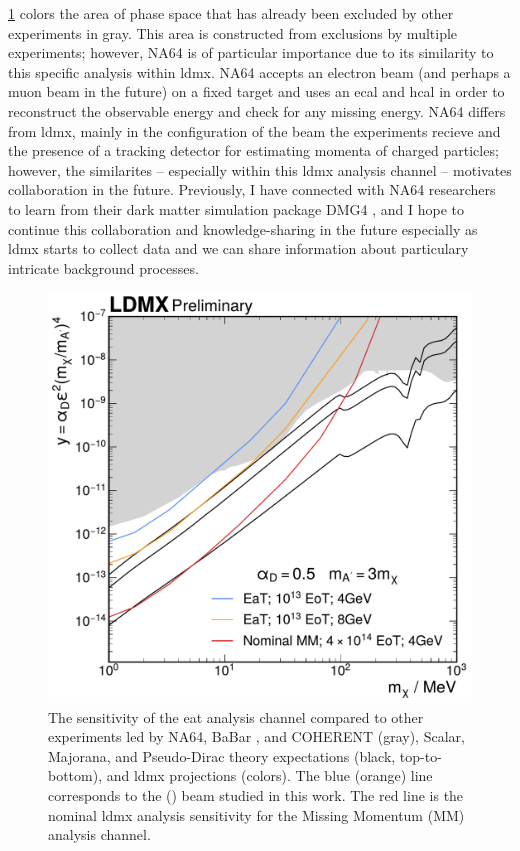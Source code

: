 \cref{fig:reach} colors the area of phase space that has already been excluded by other experiments in gray.
This area is constructed from exclusions by multiple experiments; however, NA64 \cite{na64_results_2019, na64_2020}
is of particular importance due to its similarity to this specific analysis within \ac{ldmx}.
NA64 accepts an electron beam (and perhaps a muon beam in the future) on a fixed target and uses an
\ac{ecal} and \ac{hcal} in order to reconstruct the observable energy and check for any missing energy.
NA64 differs from \ac{ldmx}, mainly in the configuration of the beam the experiments recieve and the presence
of a tracking detector for estimating momenta of charged particles; however, the similarites -- especially
within this \ac{ldmx} analysis channel -- motivates collaboration in the future.
Previously, I have connected with NA64 researchers to learn from their dark matter simulation package
DMG4 \cite{dmg4-2021,dmg4-2024}, and I hope to continue this collaboration and knowledge-sharing in the future
especially as \ac{ldmx} starts to collect data and we can share information about particulary intricate
background processes.

\begin{figure}
  \centering
  \includegraphics[width=\textwidth]{figures/ldmx/analysis/reach.pdf}
  \caption{%
    The sensitivity of the \ac{eat} analysis channel compared to
    other experiments led by NA64\cite{na64_results_2019,na64_2020}, BaBar \cite{babar-2017},
    and COHERENT\cite{coherent_2023} (gray),
    Scalar, Majorana, and Pseudo-Dirac theory expectations (black, top-to-bottom), and \ac{ldmx} projections (colors).
    The blue (orange) line corresponds to the \fourgev (\eightgev) beam studied in this work.
    The red line is the nominal \ac{ldmx} analysis sensitivity for the Missing Momentum (MM) analysis channel.
  }
  \label{fig:reach}
\end{figure}
